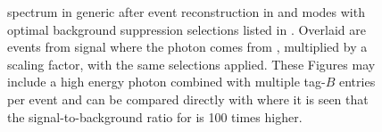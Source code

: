 \begin{figure}[hbtp!]
    \centering
    \caption{\label{fig:spectrum_after_optimisation}
    \BtoXsgamma spectrum in generic \MC after event reconstruction in \feiBp and \feiBz modes with optimal background suppression selections listed in .
    Overlaid are events from signal \MC where the photon comes from \BtoXsgamma, multiplied by a scaling factor, with the same selections applied.
    These Figures may include a high energy photon combined with multiple tag-$B$ entries per event and can be compared directly with  where it is seen that
    the signal-to-background ratio for \BtoXsgamma is 100 times higher.}
\end{figure}
